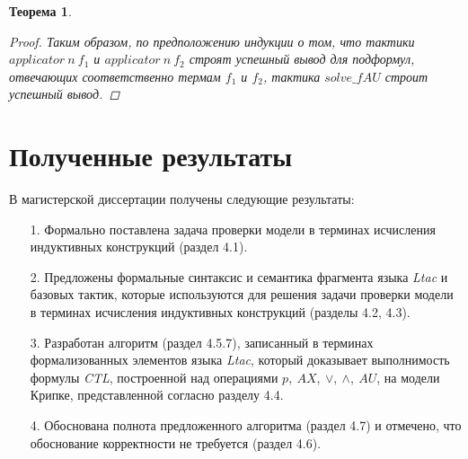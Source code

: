 \documentclass[12pt]{article}
\newtheorem{theorem}{Теорема}
\begin{document}
\begin{theorem}
\begin{proof}
Таким образом, по предположению индукции о том, что тактики $applicator\ n\ f_1$ и $applicator\ n\ f_2$ строят успешный вывод для подформул, отвечающих соответственно термам $f_1$ и $f_2$, тактика $solve\_fAU$ строит успешный вывод.





\end{proof}
\end{theorem}


\section{Полученные результаты}
В магистерской диссертации получены следующие результаты:
\begin{enumerate}
    \item[1.] Формально поставлена задача проверки модели в терминах исчисления индуктивных конструкций (раздел 4.1).
    \item[2.] Предложены формальные синтаксис и семантика фрагмента языка \textit{Ltac} и базовых тактик, которые используются для решения задачи проверки модели в терминах исчисления индуктивных конструкций (разделы 4.2, 4.3).
    \item[3.] Разработан алгоритм (раздел 4.5.7), записанный в терминах формализованных элементов языка \textit{Ltac}, который доказывает выполнимость формулы \textit{CTL}, построенной над операциями $p,\ AX,\ \vee,\ \wedge,\ AU$, на модели Крипке, представленной согласно разделу 4.4.
    \item[4.] Обоснована полнота предложенного алгоритма (раздел 4.7) и отмечено, что обоснование корректности не требуется (раздел 4.6).
\end{enumerate}
\end{document}
